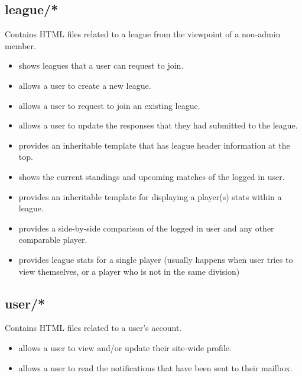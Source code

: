 \documentclass[letterpaper,10pt,english]{sphinxmanual}
\begin{document}
\subsection{league/*}
\label{\detokenize{tiger_leagues/templates/readme:league}}
Contains HTML files related to a league from the viewpoint of a non-admin
member.
\begin{itemize}
\item {} 
 shows leagues that a user can request to join.

\item {} 
 allows a user to create a new league.

\item {} 
 allows a user to request to join an existing league.

\item {} 
 allows a user to update the responses that they
had submitted to the league.

\item {} 
 provides an inheritable template that has league header
information at the top.

\item {} 
 shows the current standings and upcoming matches of
the logged in user.

\item {} 
 provides an inheritable
template for displaying a player(s) stats within a league.

\item {} 
 provides a side-by-side
comparison of the logged in user and any other comparable player.

\item {} 
 provides league stats for a
single player (usually happens when user tries to view themselves, or a
player who is not in the same division)

\end{itemize}


\subsection{user/*}
\label{\detokenize{tiger_leagues/templates/readme:user}}
Contains HTML files related to a user’s account.
\begin{itemize}
\item {} 
 allows a user to view and/or update their site-wide
profile.

\item {} 
 allows a user to read the notifications that
have been sent to their mailbox.

\end{itemize}
\end{document}
